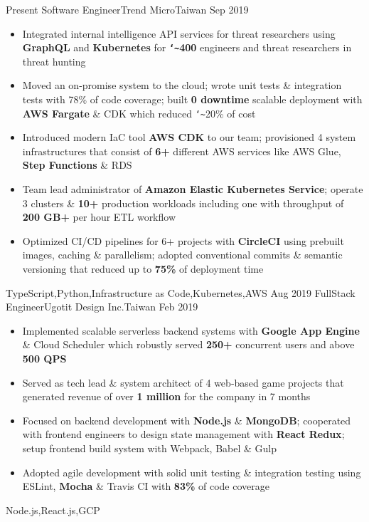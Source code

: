 \begin{experiences}
  \experience
    {Present}       {Software Engineer}{Trend Micro}{Taiwan}
    {Sep 2019}      {
                      \begin{itemize}
                        \item{Integrated internal intelligence API services for threat researchers using \textbf{GraphQL} and \textbf{Kubernetes} for \textbf{\texttt{\char`\~}400} engineers and threat researchers in threat hunting}
                        \item{Moved an on-promise system to the cloud; wrote unit tests \& integration tests with 78\% of code coverage; built \textbf{0 downtime} scalable deployment with \textbf{AWS Fargate} \& CDK which reduced \texttt{\char`\~}20\% of cost}
                        \item{Introduced modern IaC tool \textbf{AWS CDK} to our team; provisioned 4 system infrastructures that consist of \textbf{6+} different AWS services like AWS Glue, \textbf{Step Functions} \& RDS}
                        \item{Team lead administrator of \textbf{Amazon Elastic Kubernetes Service}; operate 3 clusters \& \textbf{10+} production workloads including one with throughput of \textbf{200 GB+} per hour ETL workflow}
                        \item{Optimized CI/CD pipelines for 6+ projects with \textbf{CircleCI} using prebuilt images, caching \& parallelism; adopted conventional commits \& semantic versioning that reduced up to \textbf{75\%} of deployment time}
                      \end{itemize}
                    }
                    {TypeScript,Python,Infrastructure as Code,Kubernetes,AWS}
  \emptySeparator
  \experience
    {Aug 2019}      {FullStack Engineer}{Ugotit Design Inc.}{Taiwan}
    {Feb 2019}      {
                      \begin{itemize}
                        \item{Implemented scalable serverless backend systems with \textbf{Google App Engine} \& Cloud Scheduler which robustly served \textbf{250+} concurrent users and above \textbf{500 QPS}}
                        \item{Served as tech lead \& system architect of 4 web‐based game projects that generated revenue of over \textbf{1 million} for the company in 7 months}
                        \item{Focused on backend development with \textbf{Node.js} \& \textbf{MongoDB}; cooperated with frontend engineers to design state management with \textbf{React Redux}; setup frontend build system with Webpack, Babel \& Gulp}
                        \item{Adopted agile development with solid unit testing \& integration testing using ESLint, \textbf{Mocha} \& Travis CI with \textbf{83\%} of code coverage}
                      \end{itemize}
                    }
                    {Node.js,React.js,GCP}
\end{experiences}
